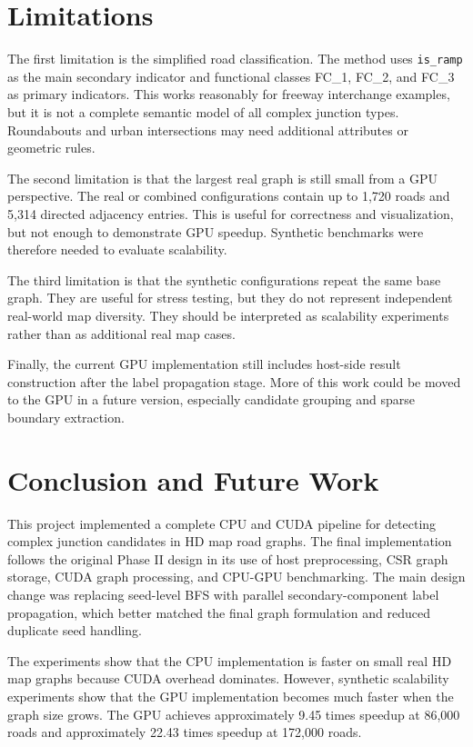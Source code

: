 \documentclass[conference]{IEEEtran}
\begin{document}
\section{Limitations}

The first limitation is the simplified road classification. The method uses \texttt{is\_ramp} as the main secondary indicator and functional classes FC\_1, FC\_2, and FC\_3 as primary indicators. This works reasonably for freeway interchange examples, but it is not a complete semantic model of all complex junction types. Roundabouts and urban intersections may need additional attributes or geometric rules.

The second limitation is that the largest real graph is still small from a GPU perspective. The real or combined configurations contain up to 1,720 roads and 5,314 directed adjacency entries. This is useful for correctness and visualization, but not enough to demonstrate GPU speedup. Synthetic benchmarks were therefore needed to evaluate scalability.

The third limitation is that the synthetic configurations repeat the same base graph. They are useful for stress testing, but they do not represent independent real-world map diversity. They should be interpreted as scalability experiments rather than as additional real map cases.

Finally, the current GPU implementation still includes host-side result construction after the label propagation stage. More of this work could be moved to the GPU in a future version, especially candidate grouping and sparse boundary extraction.

\section{Conclusion and Future Work}

This project implemented a complete CPU and CUDA pipeline for detecting complex junction candidates in HD map road graphs. The final implementation follows the original Phase II design in its use of host preprocessing, CSR graph storage, CUDA graph processing, and CPU-GPU benchmarking. The main design change was replacing seed-level BFS with parallel secondary-component label propagation, which better matched the final graph formulation and reduced duplicate seed handling.

The experiments show that the CPU implementation is faster on small real HD map graphs because CUDA overhead dominates. However, synthetic scalability experiments show that the GPU implementation becomes much faster when the graph size grows. The GPU achieves approximately 9.45 times speedup at 86,000 roads and approximately 22.43 times speedup at 172,000 roads.
\end{document}
